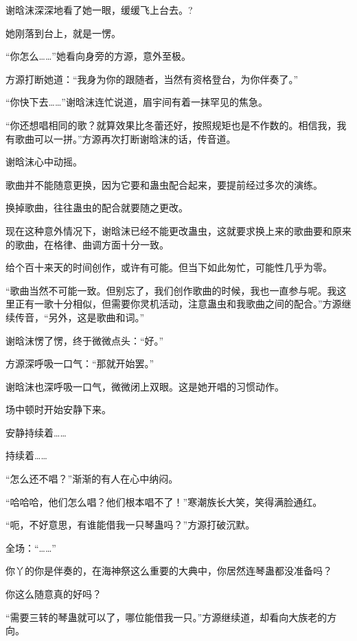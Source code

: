 
\begin{this_body}



谢晗沫深深地看了她一眼，缓缓飞上台去。?

她刚落到台上，就是一愣。

“你怎么……”她看向身旁的方源，意外至极。

方源打断她道：“我身为你的跟随者，当然有资格登台，为你伴奏了。”

“你快下去……”谢晗沫连忙说道，眉宇间有着一抹罕见的焦急。

“你还想唱相同的歌？就算效果比冬蕾还好，按照规矩也是不作数的。相信我，我有歌曲可以一拼。”方源再次打断谢晗沫的话，传音道。

谢晗沫心中动摇。

歌曲并不能随意更换，因为它要和蛊虫配合起来，要提前经过多次的演练。

换掉歌曲，往往蛊虫的配合就要随之更改。

现在这种意外情况下，谢晗沫已经不能更改蛊虫，这就要求换上来的歌曲要和原来的歌曲，在格律、曲调方面十分一致。

给个百十来天的时间创作，或许有可能。但当下如此匆忙，可能性几乎为零。

“歌曲当然不可能一致。但别忘了，我们创作歌曲的时候，我也一直参与呢。我这里正有一歌十分相似，但需要你灵机活动，注意蛊虫和我歌曲之间的配合。”方源继续传音，“另外，这是歌曲和词。”

谢晗沫愣了愣，终于微微点头：“好。”

方源深呼吸一口气：“那就开始罢。”

谢晗沫也深呼吸一口气，微微闭上双眼。这是她开唱的习惯动作。

场中顿时开始安静下来。

安静持续着……

持续着……

“怎么还不唱？”渐渐的有人在心中纳闷。

“哈哈哈，他们怎么唱？他们根本唱不了！”寒潮族长大笑，笑得满脸通红。

“呃，不好意思，有谁能借我一只琴蛊吗？”方源打破沉默。

全场：“……”

你丫的你是伴奏的，在海神祭这么重要的大典中，你居然连琴蛊都没准备吗？

你这么随意真的好吗？

“需要三转的琴蛊就可以了，哪位能借我一只。”方源继续道，却看向大族老的方向。


\end{this_body}
